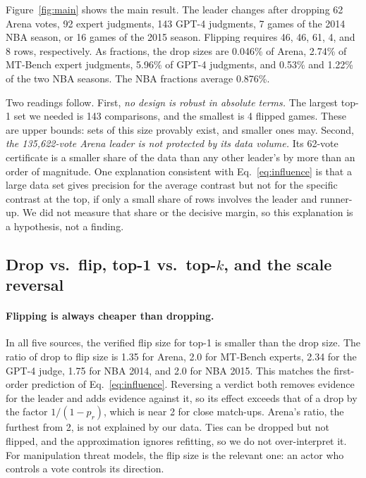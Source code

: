 \documentclass{article}
\begin{document}
Figure~\ref{fig:main} shows the main result. The leader changes after dropping 62 Arena votes, 92 expert judgments, 143 GPT-4 judgments, 7 games of the 2014 NBA season, or 16 games of the 2015 season. Flipping requires 46, 46, 61, 4, and 8 rows, respectively. As fractions, the drop sizes are 0.046\% of Arena, 2.74\% of MT-Bench expert judgments, 5.96\% of GPT-4 judgments, and 0.53\% and 1.22\% of the two NBA seasons. The NBA fractions average 0.876\%.

Two readings follow. First, \emph{no design is robust in absolute terms.} The largest top-1 set we needed is 143 comparisons, and the smallest is 4 flipped games. These are upper bounds: sets of this size provably exist, and smaller ones may. Second, \emph{the 135,622-vote Arena leader is not protected by its data volume.} Its 62-vote certificate is a smaller share of the data than any other leader's by more than an order of magnitude. One explanation consistent with Eq.~\eqref{eq:influence} is that a large data set gives precision for the average contrast but not for the specific contrast at the top, if only a small share of rows involves the leader and runner-up. We did not measure that share or the decisive margin, so this explanation is a hypothesis, not a finding.

\subsection{Drop vs.\ flip, top-1 vs.\ top-$k$, and the scale reversal}
\label{sec:res-contrasts}

\paragraph{Flipping is always cheaper than dropping.}
In all five sources, the verified flip size for top-1 is smaller than the drop size. The ratio of drop to flip size is 1.35 for Arena, 2.0 for MT-Bench experts, 2.34 for the GPT-4 judge, 1.75 for NBA 2014, and 2.0 for NBA 2015. This matches the first-order prediction of Eq.~\eqref{eq:influence}. Reversing a verdict both removes evidence for the leader and adds evidence against it, so its effect exceeds that of a drop by the factor $1/(1-p_r)$, which is near 2 for close match-ups. Arena's ratio, the furthest from 2, is not explained by our data. Ties can be dropped but not flipped, and the approximation ignores refitting, so we do not over-interpret it. For manipulation threat models, the flip size is the relevant one: an actor who controls a vote controls its direction.
\end{document}
